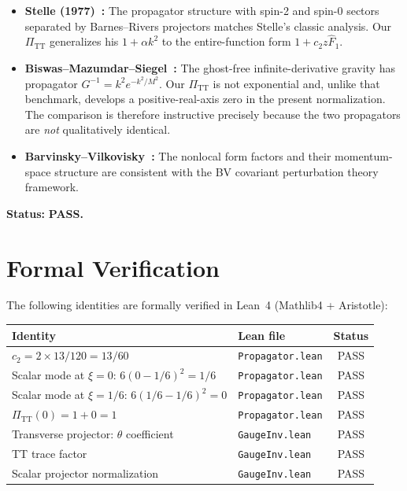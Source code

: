 \documentclass[11pt,a4paper]{article}
\theoremstyle{plain}
\theoremstyle{definition}
\begin{document}
\begin{itemize}[nosep]
  \item \textbf{Stelle (1977)~\cite{Ste77}:} The propagator structure
    with spin-2 and spin-0 sectors separated by Barnes--Rivers projectors
    matches Stelle's classic analysis. Our $\Pi_{\mathrm{TT}}$ generalizes
    his $1 + \alpha k^2$ to the entire-function form $1 + c_2 z \hat{F}_1$.
  \item \textbf{Biswas--Mazumdar--Siegel~\cite{BMS06}:} The ghost-free
    infinite-derivative gravity has propagator
    $G^{-1} = k^2 e^{-k^2/M^2}$. Our $\Pi_{\mathrm{TT}}$ is not
    exponential and, unlike that benchmark, develops a positive-real-axis
    zero in the present normalization. The comparison is therefore
    instructive precisely because the two propagators are \emph{not}
    qualitatively identical.
  \item \textbf{Barvinsky--Vilkovisky~\cite{BV87}:} The nonlocal form
    factors and their momentum-space structure are consistent with the
    BV covariant perturbation theory framework.
\end{itemize}

\noindent\textbf{Status:} \textcolor{green!50!black}{\textbf{PASS.}}

\section{Formal Verification}\label{sec:lean}

The following identities are formally verified in Lean~4
(Mathlib4 + Aristotle):

\begin{center}
\begin{tabular}{llc}
\toprule
Identity & Lean file & Status \\
\midrule
$c_2 = 2 \times 13/120 = 13/60$ & \texttt{Propagator.lean} & PASS \\
Scalar mode at $\xi = 0$: $6(0-1/6)^2 = 1/6$ &
\texttt{Propagator.lean} & PASS \\
Scalar mode at $\xi = 1/6$: $6(1/6-1/6)^2 = 0$ &
\texttt{Propagator.lean} & PASS \\
$\Pi_{\mathrm{TT}}(0) = 1 + 0 = 1$ &
\texttt{Propagator.lean} & PASS \\
Transverse projector: $\theta$ coefficient &
\texttt{GaugeInv.lean} & PASS \\
TT trace factor & \texttt{GaugeInv.lean} & PASS \\
Scalar projector normalization & \texttt{GaugeInv.lean} & PASS \\
\bottomrule
\end{tabular}
\end{center}
\end{document}
